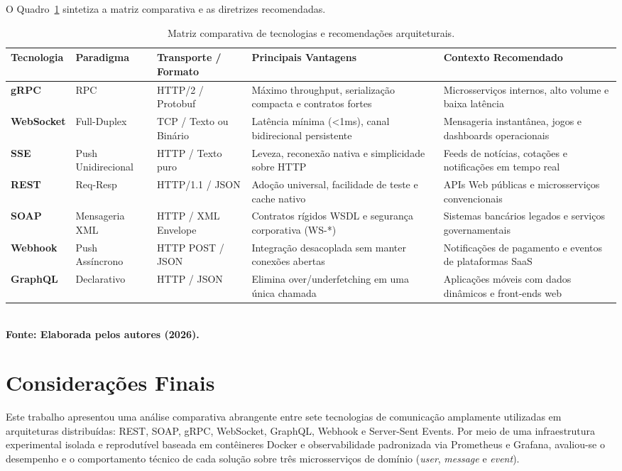 \documentclass[a4paper,12pt]{article}
\begin{document}
O Quadro~\ref{quadro:diretrizes} sintetiza a matriz comparativa e as diretrizes recomendadas.

\begin{table}[H]
\centering
\scriptsize
\caption{Matriz comparativa de tecnologias e recomendações arquiteturais.}
\label{quadro:diretrizes}
\begin{tabularx}{\textwidth}{|l|l|l|X|X|}
\hline
\textbf{Tecnologia} & \textbf{Paradigma} & \textbf{Transporte / Formato} & \textbf{Principais Vantagens} & \textbf{Contexto Recomendado} \\ \hline
\textbf{gRPC} & RPC & HTTP/2 / Protobuf & Máximo throughput, serialização compacta e contratos fortes & Microsserviços internos, alto volume e baixa latência \\ \hline
\textbf{WebSocket} & Full-Duplex & TCP / Texto ou Binário & Latência mínima (<1ms), canal bidirecional persistente & Mensageria instantânea, jogos e dashboards operacionais \\ \hline
\textbf{SSE} & Push Unidirecional & HTTP / Texto puro & Leveza, reconexão nativa e simplicidade sobre HTTP & Feeds de notícias, cotações e notificações em tempo real \\ \hline
\textbf{REST} & Req-Resp & HTTP/1.1 / JSON & Adoção universal, facilidade de teste e cache nativo & APIs Web públicas e microsserviços convencionais \\ \hline
\textbf{SOAP} & Mensageria XML & HTTP / XML Envelope & Contratos rígidos WSDL e segurança corporativa (WS-*) & Sistemas bancários legados e serviços governamentais \\ \hline
\textbf{Webhook} & Push Assíncrono & HTTP POST / JSON & Integração desacoplada sem manter conexões abertas & Notificações de pagamento e eventos de plataformas SaaS \\ \hline
\textbf{GraphQL} & Declarativo & HTTP / JSON & Elimina over/underfetching em uma única chamada & Aplicações móveis com dados dinâmicos e front-ends web \\ \hline
\end{tabularx}
{\footnotesize\\ \textbf{Fonte: Elaborada pelos autores (2026).}}
\end{table}

\section{Considerações Finais}
\label{sec:conclusao}

Este trabalho apresentou uma análise comparativa abrangente entre sete tecnologias de comunicação amplamente utilizadas em arquiteturas distribuídas: REST, SOAP, gRPC, WebSocket, GraphQL, Webhook e Server-Sent Events. Por meio de uma infraestrutura experimental isolada e reprodutível baseada em contêineres Docker e observabilidade padronizada via Prometheus e Grafana, avaliou-se o desempenho e o comportamento técnico de cada solução sobre três microsserviços de domínio (\textit{user}, \textit{message} e \textit{event}).
\end{document}

